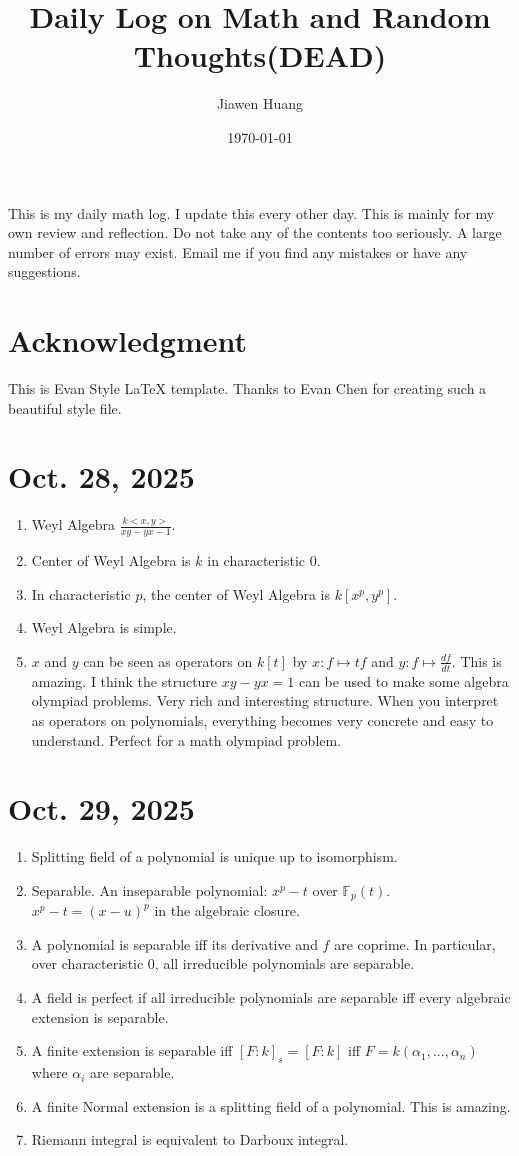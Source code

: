 \documentclass[15pt]{scrartcl}
\begin{document}
\title{Daily Log on Math and Random Thoughts(DEAD)}
\date{\today}
\author{Jiawen Huang}
\maketitle
This is my daily math log. I update this every other day. This is mainly for my own review and reflection. Do not take any of the contents too seriously. A large number of errors may exist. Email me if you find any mistakes or have any suggestions. 

\newpage
\tableofcontents
\newpage

\section{Acknowledgment}
This is Evan Style LaTeX template. Thanks to Evan Chen for creating such a beautiful style file.
\newpage 
\section{Oct. 28, 2025}
\begin{enumerate}
\item Weyl Algebra $\frac{k<x,y>}{xy-yx-1}$. 
\item Center of Weyl Algebra is $k$ in characteristic 0.
\item In characteristic $p$, the center of Weyl Algebra is $k[x^p,y^p]$.
\item Weyl Algebra is simple.
\item $x$ and $y$ can be seen as operators on $k[t]$ by $x:f\mapsto tf$ and $y:f\mapsto \frac{df}{dt}$. This is amazing. 
I think the structure $xy-yx=1$ can be used to make some algebra olympiad problems. Very rich and interesting structure. 
When you interpret as operators on polynomials, everything becomes very concrete and easy to understand. Perfect for a math olympiad problem.

\end{enumerate}

\section{Oct. 29, 2025}
\begin{enumerate}
\item Splitting field of a polynomial is unique up to isomorphism.
\item Separable. An inseparable polynomial: $x^p-t$ over $\mathbb{F}_p(t)$. $x^p-t=(x-u)^p$ in the algebraic closure. 
\item A polynomial is separable iff its derivative and $f$ are coprime. In particular, over characteristic 0, all irreducible polynomials are separable.
\item A field is perfect if all irreducible polynomials are separable iff every algebraic extension is separable. 
\item A finite extension is separable iff $[F:k]_s=[F:k]$ iff $F=k(\alpha_1,...,\alpha_n)$ where $\alpha_i$ are separable.
\item A finite Normal extension is a splitting field of a polynomial. This is amazing. 
\item Riemann integral is equivalent to Darboux integral.
\end{enumerate}
\end{document}
